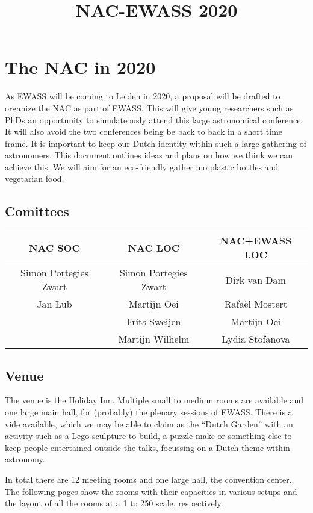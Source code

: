 \documentclass{article}
\title{NAC-EWASS 2020}
\begin{document}
\maketitle

\section{The NAC in 2020}
As EWASS will be coming to Leiden in 2020, a proposal will be drafted to organize the NAC as part of EWASS. This will give young researchers such as PhDs an opportunity to simulateously attend this large astronomical conference. It will also avoid the two conferences being be back to back in a short time frame. It is important to keep our Dutch identity within such a large gathering of astronomers. This document outlines ideas and plans on how we think we can achieve this. We will aim for an eco-friendly gather: no plastic bottles and vegetarian food.

\subsection{Comittees}
\begin{center}
    \begin{tabular}{ccc}
        \textbf{NAC SOC }& \textbf{NAC LOC} & \textbf{NAC+EWASS LOC} \\
        \hline
        Simon Portegies Zwart & Simon Portegies Zwart & Dirk van Dam \\
        Jan Lub               & Martijn Oei           & Rafa\"el Mostert \\
                              & Frits Sweijen         & Martijn Oei \\
                              & Martijn Wilhelm       & Lydia Stofanova
    \end{tabular}
\end{center}
\subsection{Venue}
The venue is the Holiday Inn. Multiple small to medium rooms are available and one large main hall, for (probably) the plenary sessions of EWASS. There is a vide available, which we may be able to claim as the ``Dutch Garden'' with an activity such as a Lego sculpture to build, a puzzle make or something else to keep people entertained outside the talks, focussing on a Dutch theme within astronomy.

In total there are 12 meeting rooms and one large hall, the convention center. The following pages show the rooms with their capacities in various setups and the layout of all the rooms at a 1 to 250 scale, respectively.
\end{document}

